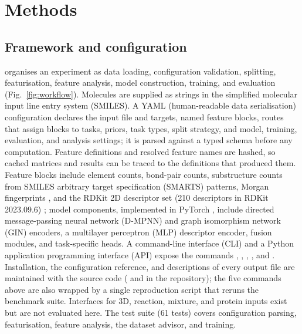 \section{Methods}\label{sec:methods}

\subsection{Framework and configuration}\label{subsec:architecture}

\framework{} organises an experiment as data loading, configuration validation, splitting, featurisation, feature analysis, model construction, training, and evaluation (Fig.~\ref{fig:workflow}). Molecules are supplied as strings in the simplified molecular input line entry system (SMILES). A YAML (human-readable data serialisation) configuration declares the input file and targets, named feature blocks, routes that assign blocks to tasks, priors, task types, split strategy, and model, training, evaluation, and analysis settings; it is parsed against a typed schema before any computation. Feature definitions and resolved feature names are hashed, so cached matrices and results can be traced to the definitions that produced them. Feature blocks include element counts, bond-pair counts, substructure counts from SMILES arbitrary target specification (SMARTS) patterns, Morgan fingerprints \cite{rogers2010ecfp}, and the RDKit 2D descriptor set (210 descriptors in RDKit 2023.09.6) \cite{rdkit}; model components, implemented in PyTorch \cite{paszke2019pytorch}, include directed message-passing neural network (D-MPNN) and graph isomorphism network (GIN) encoders, a multilayer perceptron (MLP) descriptor encoder, fusion modules, and task-specific heads. A command-line interface (CLI) and a Python application programming interface (API) expose the commands , , , , and . Installation, the configuration reference, and descriptions of every output file are maintained with the source code ( and  in the repository); the five commands above are also wrapped by a single reproduction script that reruns the benchmark suite. Interfaces for 3D, reaction, mixture, and protein inputs exist but are not evaluated here. The test suite (61 tests) covers configuration parsing, featurisation, feature analysis, the dataset advisor, and training.

